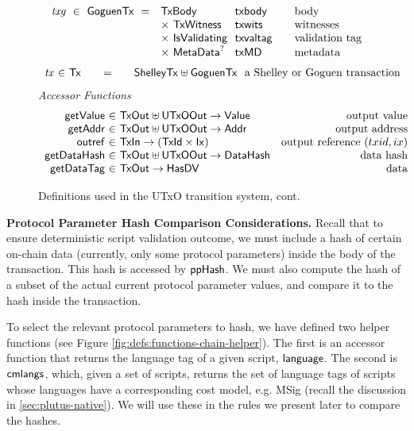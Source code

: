 \begin{figure*}[htb]
\begin{equation*}
\begin{array}{r@{~~}l@{~~}l@{\qquad}l}
      \var{txg} ~\in~ \GoguenTx ~=~
      & \TxBody & \fun{txbody} & \text{body}\\
      & \times ~\TxWitness & \fun{txwits} & \text{witnesses}\\
      & \times ~\IsValidating & \fun{txvaltag}&\text{validation tag}\\
      & \times ~\MetaData^? & \fun{txMD}&\text{metadata}\\
    \end{array}
  \end{equation*}
  \begin{equation*}
    \begin{array}{r@{~\in~}l@{\qquad=\qquad}lr}
      \var{tx} & \Tx & \ShelleyTx \uniondistinct \GoguenTx
      \text{~~a Shelley or Goguen transaction}\\
    \end{array}
  \end{equation*}
  \emph{Accessor Functions}
  \begin{equation*}
    \begin{array}{r@{~\in~}lr}
      \fun{getValue} & \TxOut \uniondistinct \UTxOOut \to \Value & \text{output value} \\
      \fun{getAddr} & \TxOut \uniondistinct \UTxOOut \to \Addr & \text{output address} \\
      \fun{outref} & \TxIn \to (\TxId \times \Ix) & \text{output reference $(txid,ix)$} \\
      \fun{getDataHash} & \TxOut \uniondistinct \UTxOOut \to \DataHash & \text{data hash} \\
      \fun{getDataTag} & \TxOut \to \HasDV & \text{data} \\
    \end{array}
  \end{equation*}
  \caption{Definitions used in the UTxO transition system, cont.}
  \label{fig:defs:utxo-shelley-2}
\end{figure*}

\textbf{Protocol Parameter Hash Comparison Considerations.}
Recall that to ensure deterministic script validation outcome, we must include
a hash of certain on-chain data (currently, only some protocol parameters)
inside the body of the transaction. This hash is accessed by $\mathsf{ppHash}$.
We must also compute the hash of a subset of the actual current protocol parameter values,
and compare it to the hash inside the transaction.

To select the relevant protocol parameters to hash, we have defined two helper
functions (see Figure \ref{fig:defs:functions-chain-helper}). The first
is an accessor function that returns the language tag of a given script, $\mathsf{language}$.
The second is $\mathsf{cmlangs}$, which, given a set of scripts, returns the set
of language tags of scripts whose languages have a corresponding cost model,
e.g. MSig (recall the discussion in \ref{sec:plutus-native}).
We will use these in the rules we present later to compare the hashes.

